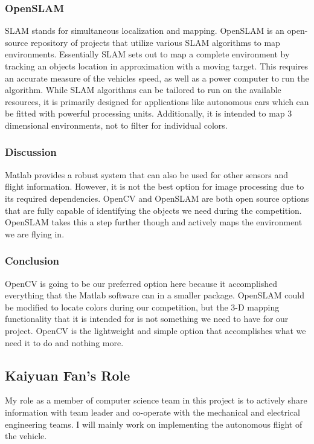 \documentclass[onecolumn, draftclsnofoot,10pt, compsoc]{IEEEtran}
\begin{document}

\subsubsection{OpenSLAM}

SLAM stands for simultaneous localization and mapping. 
OpenSLAM\cite{r31} is an open-source repository of projects that 
utilize various SLAM algorithms to map environments. Essentially 
SLAM sets out to map a complete environment by tracking an objects 
location in approximation with a moving target. This requires an 
accurate measure of the vehicles speed, as well as a power computer 
to run the algorithm. While SLAM algorithms can be tailored to run 
on the available resources, it is primarily designed for 
applications like autonomous cars which can be fitted with powerful 
processing units. Additionally, it is intended to map 3 dimensional 
environments, not to filter for individual colors.


\subsubsection{Discussion}

Matlab provides a robust system that can also be used for other 
sensors and flight information. However, it is not the best option 
for image processing due to its required dependencies. OpenCV and 
OpenSLAM are both open source options that are fully capable of 
identifying the objects we need during the competition. OpenSLAM 
takes this a step further though and actively maps the environment 
we are flying in. 

\subsubsection{Conclusion}

OpenCV is going to be our preferred option here because it 
accomplished everything that the Matlab software can in a smaller 
package. OpenSLAM could be modified to locate colors during our 
competition, but the 3-D mapping functionality that it is intended 
for is not something we need to have for our project. OpenCV is the 
lightweight and simple option that accomplishes what we need it to 
do and nothing more. 


\subsection{Kaiyuan Fan's Role}
My role as a member of computer science team in this project is to actively share information with team leader and co-operate with the mechanical and electrical engineering teams. I will mainly work on implementing the autonomous flight of the vehicle.
\end{document}
